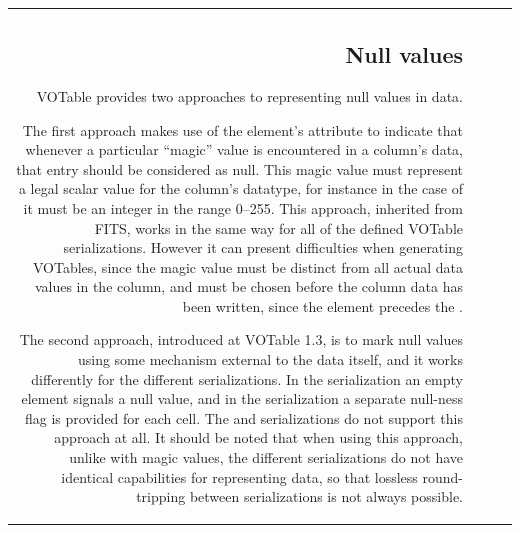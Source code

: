 \begin{tabular}{RRCp{0.8\textwidth}}
\begin{center}
{\subsection{Null values}
\label{sec:NULL}

VOTable provides two approaches to representing null values in data.

The first approach makes use of the  element's 
attribute to indicate that whenever a particular ``magic'' value is
encountered in a column's data, that entry should be considered as null.
This magic value must represent a legal scalar value for the column's
datatype, for instance in the case of {}
it must be an integer in the range 0--255.
This approach, inherited from FITS, works in the same way for all
of the defined VOTable serializations.
However it can present difficulties when generating VOTables,
since the magic value must be distinct from all actual data values
in the column, and must be chosen before the column data has
been written, since the  element precedes the .

The second approach, introduced at VOTable 1.3,
is to mark null values using some mechanism external
to the data itself, and it works differently for the different serializations.
In the  serialization
an empty  element signals a null value, and
in the  serialization
a separate null-ness flag is provided for each cell.
The  and  serializations do not support this approach
at all.
It should be noted that when using this approach, unlike with magic values,
the different serializations do not have identical capabilities for
representing data, so that lossless round-tripping between serializations
is not always possible.

}
\end{center}
\end{tabular}
